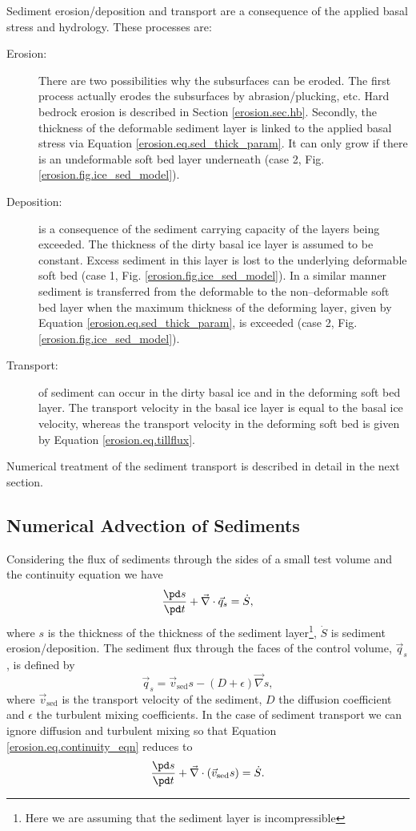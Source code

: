 Sediment erosion/deposition and transport are a consequence of the applied basal stress and hydrology. These processes are:
\begin{description}
\item[Erosion:] There are two possibilities why the subsurfaces can be eroded. The first process actually erodes the subsurfaces by abrasion/plucking, etc. Hard bedrock erosion is described in Section \ref{erosion.sec.hb}. Secondly, the thickness of the deformable sediment layer is linked to the applied basal stress via Equation \eqref{erosion.eq.sed_thick_param}. It can only grow if there is an undeformable soft bed layer underneath (case 2, Fig. \ref{erosion.fig.ice_sed_model}).
\item[Deposition:] is a consequence of the sediment carrying capacity of the layers being exceeded. The thickness of the dirty basal ice layer is assumed to be
constant. Excess sediment in this layer is lost to the underlying deformable soft bed (case 1, Fig. \ref{erosion.fig.ice_sed_model}). In a similar manner sediment is transferred from the deformable to the non--deformable soft bed layer when the maximum thickness of the deforming layer, given by Equation \eqref{erosion.eq.sed_thick_param}, is exceeded (case 2, Fig.\ref{erosion.fig.ice_sed_model}).
\item[Transport:] of sediment can occur in the dirty basal ice and in the deforming soft bed layer. The transport velocity in the basal ice layer is equal to the basal ice velocity, whereas the transport velocity in the deforming soft bed is given by Equation \eqref{erosion.eq.tillflux}.
\end{description}
Numerical treatment of the sediment transport is described in detail in the next section.

\subsection{Numerical Advection of Sediments}
Considering the flux of sediments through the sides of a small test volume and the continuity equation we have
\begin{equation}
  \label{erosion.eq.continuity_eqn}
  \frac{\pd s}{\pd t}+\vec\nabla\cdot\vec{q}_s=\dot{S},
\end{equation}
where $s$ is the thickness of the thickness of the sediment layer\footnote{Here we are assuming that the sediment layer is incompressible}, $\dot{S}$ is sediment erosion/deposition. The sediment flux through the faces of the control volume, $\vec{q}_s$, is defined by
\begin{equation}
  \vec{q}_s=\vec{v}_{\text{sed}}s-(D+\epsilon)\vec\nabla s,
\end{equation}
where $\vec{v}_{\text{sed}}$ is the transport velocity of the sediment, $D$ the diffusion coefficient and $\epsilon$ the turbulent mixing coefficients. In the case of sediment transport we can ignore diffusion and turbulent mixing so that Equation \eqref{erosion.eq.continuity_eqn} reduces to
\begin{equation}
  \label{erosion.eq.transport_eqn}
  \frac{\pd s}{\pd t}+\vec\nabla\cdot(\vec{v}_{\text{sed}}s)=\dot{S}.
\end{equation}

